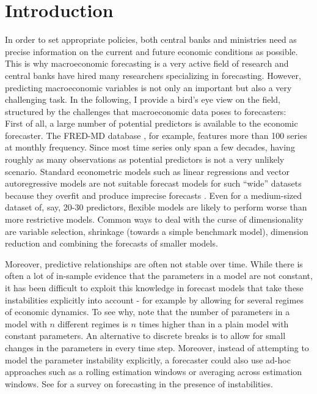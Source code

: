 \chapter{Introduction} %

In order to set appropriate policies, both central banks and ministries need as precise information on the current and future economic conditions as possible. This is why macroeconomic forecasting is a very active field of research and central banks have hired many researchers specializing in forecasting. However, predicting macroeconomic variables is not only an important but also a very challenging task. In the following, I provide a bird's eye view on the field, structured by the challenges that macroeconomic data poses to forecasters:\\


First of all, a large number of potential predictors is available to the economic forecaster. The FRED-MD database \citep{McCrackenNg2016}, for example, features more than 100 series at monthly frequency. Since most time series only span a few decades, having roughly as many observations as potential predictors is not a very unlikely scenario. Standard econometric models such as linear regressions and vector autoregressive models are not suitable forecast models for such ``wide'' datasets because they overfit and produce imprecise forecasts \citep{StockWatson2006}. Even for a medium-sized dataset of, say, 20-30 predictors, flexible models are likely to perform worse than more restrictive models. Common ways to deal with the curse of dimensionality are variable selection, shrinkage (towards a simple benchmark model), dimension reduction and combining the forecasts of smaller models.

Moreover, predictive relationships are often not stable over time. While there is often a lot of in-sample evidence that the parameters in a model are not constant, it has been difficult to exploit this knowledge in forecast models that take these instabilities explicitly into account - for example by allowing for several regimes of economic dynamics. To see why, note that the number of parameters in a model with $n$ different regimes is $n$ times higher than in a plain model with constant parameters. An alternative to discrete breaks is to allow for small changes in the parameters in every time step. Moreover, instead of attempting to model the parameter instability explicitly, a forecaster could also use ad-hoc approaches such as a rolling estimation windows or averaging across estimation windows.  See \citet{Rossi2013} for a survey on forecasting in the presence of instabilities.

